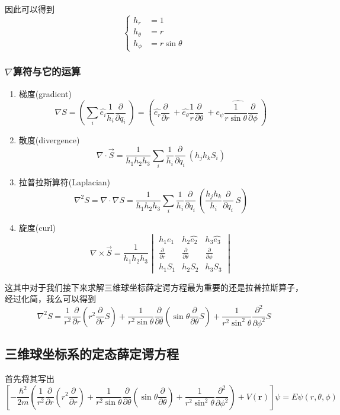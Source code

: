 \documentclass{article}
\newcommand{\vmthree}[9]{
    \begin{vmatrix}
        #1&#2&#3\\
        #4&#5&#6\\
        #7&#8&#9
    \end{vmatrix}
}
\newcommand{\Da}[2]{\frac{\partial}{\partial#2}#1}
\begin{document}
    因此可以得到
    \[
        \begin{cases}
        h_r&=1\\
        h_\theta&=r\\
        h_\phi&=r\sin\theta
    \end{cases}
    \]
   
\subsubsection{$\nabla$算符与它的运算}
\begin{enumerate}
    \item 梯度(gradient)
        \begin{equation*}
            \nabla S =\left(\sum_{i}\hat{e_i}\frac{1}{h_i}\Da{~}{q_i}\right)=\left(\hat{e_{r}}\Da{~}{r}+\hat{e_\theta}\frac{1}{r}\Da{~}{\theta}+\hat{e_\psi\frac{1}{r\sin\theta}\Da{~}{\phi}}\right)
        \end{equation*}
    \item 散度(divergence)
        \[
            \nabla\cdot \vec{S}=\frac{1}{h_1h_2h_3}\sum_{i}\frac{1}{h_i}\Da{~}{q_i}(h_jh_kS_i)
        \]
    \item 拉普拉斯算符(Laplacian)
        \[
            \nabla^2 S=\nabla\cdot\nabla S=\frac{1}{h_1h_2h_3}\sum_{i}\frac{1}{h_i}\Da{~}{q_i}\left(\frac{h_jh_k}{h_i}\Da{~}{q_i}S\right)
        \]
        \item 旋度(curl)
            \[
                \nabla\times\vec{S}=\frac{1}{h_1h_2h_3}\vmthree{h_1\hat{e_1}}{h_2\hat{e_2}}{h_3\hat{e_3}}{\displaystyle\Da{~}{r}}{\displaystyle\Da{~}{\theta}}{\displaystyle\Da{~}{\phi}}{h_1S_1}{h_2S_2}{h_3S_3}
            \]
\end{enumerate}

这其中对于我们接下来求解三维球坐标薛定谔方程最为重要的还是拉普拉斯算子，经过化简，我么可以得到
\[
    \nabla^2 S=\frac{1}{r^2}\frac{\partial}{\partial r}\left(r^2\frac{\partial}{\partial r}S\right)+\frac{1}{r^2\sin\theta}\frac{\partial}{\partial\theta}\left(\sin\theta\frac{\partial}{\partial\theta}S\right)+\frac{1}{r^2\sin^2\theta}\frac{\partial^2}{\partial\phi^2}S
\]

\subsection{三维球坐标系的定态薛定谔方程}
首先将其写出
\[
    \left[-\frac{\hbar^2}{2m}\left(\frac{1}{r^2}\frac{\partial}{\partial r}\left(r^2\frac{\partial}{\partial r}\right)+\frac{1}{r^2\sin\theta}\frac{\partial}{\partial\theta}\left(\sin\theta\frac{\partial}{\partial\theta}\right)+\frac{1}{r^2\sin^2\theta}\frac{\partial^2}{\partial\phi^2}\right)+V(\textbf{r})\right]\psi=E\psi(r,\theta,\phi)
\]
\end{document}
